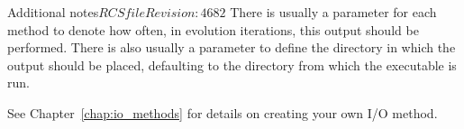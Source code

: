 \begin{cactuspart}{Additional notes}{$RCSfile$}{$Revision: 4682 $}
There is usually a parameter for each method to denote how often, in evolution
iterations, this output should be performed.  There is also usually a parameter
to define the directory in which the output should be placed, defaulting to the
directory from which the executable is run.

See Chapter~\ref{chap:io_methods} for details on creating your own I/O method.



\end{cactuspart}
